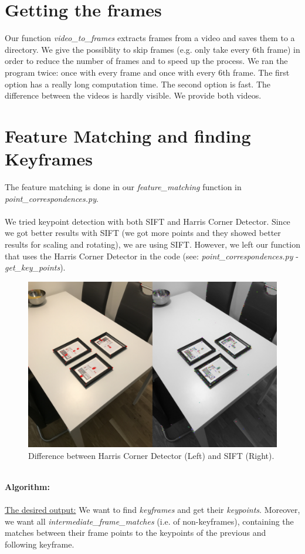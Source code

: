 \documentclass[paper=a4, fontsize=11pt]{scrartcl}
\numberwithin{equation}{section}		%
\numberwithin{figure}{section}			%
\numberwithin{table}{section}				%
\begin{document}
\section*{Getting the frames}
Our function \emph{video\_to\_frames} extracts frames from a video and saves them to a directory. We give the possiblity to skip frames (e.g. only take every 6th frame) in order to reduce the number of frames and to speed up the process. We ran the program twice: once with every frame and once with every 6th frame. The first option has a really long computation time. The second option is fast. The difference between the videos is hardly visible. We provide both videos.

\section*{Feature Matching and finding Keyframes}
The feature matching is done in our \emph{feature\_matching} function in \emph{point\_correspondences.py}.\\\\We tried keypoint detection with both SIFT and Harris Corner Detector. Since we got better results with SIFT (we got more points and they showed better results for scaling and rotating), we are using SIFT. However, we left our function that uses the Harris Corner Detector in the code (see: \emph{point\_correspondences.py} - \emph{get\_key\_points}).
\begin{figure}[h!]
\centering
\includegraphics[width=1\textwidth]{img/hcdvssift}
\caption{Difference between Harris Corner Detector (Left) and SIFT (Right).}
\end{figure}
\\\textbf{Algorithm:}\\\\\underline{The desired output:} We want to find \emph{keyframes} and get their \emph{keypoints}. Moreover, we want all \emph{intermediate\_frame\_matches} (i.e. of non-keyframes), containing the matches between their frame points to the keypoints of the previous and following keyframe.
\end{document}
